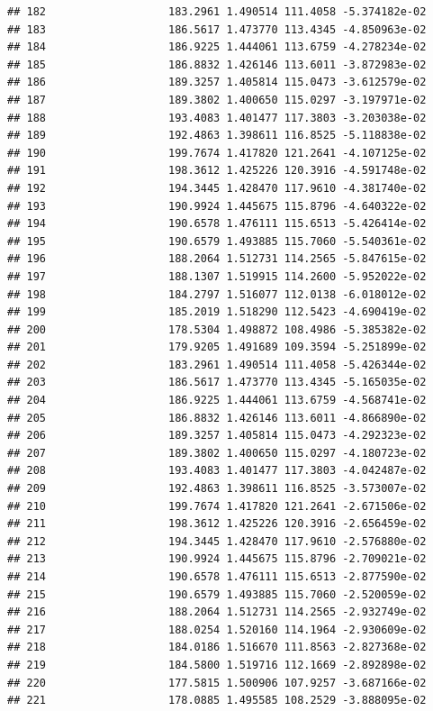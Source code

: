 \documentclass[
]{article}
\begin{document}
\begin{verbatim}
## 182                   183.2961 1.490514 111.4058 -5.374182e-02
## 183                   186.5617 1.473770 113.4345 -4.850963e-02
## 184                   186.9225 1.444061 113.6759 -4.278234e-02
## 185                   186.8832 1.426146 113.6011 -3.872983e-02
## 186                   189.3257 1.405814 115.0473 -3.612579e-02
## 187                   189.3802 1.400650 115.0297 -3.197971e-02
## 188                   193.4083 1.401477 117.3803 -3.203038e-02
## 189                   192.4863 1.398611 116.8525 -5.118838e-02
## 190                   199.7674 1.417820 121.2641 -4.107125e-02
## 191                   198.3612 1.425226 120.3916 -4.591748e-02
## 192                   194.3445 1.428470 117.9610 -4.381740e-02
## 193                   190.9924 1.445675 115.8796 -4.640322e-02
## 194                   190.6578 1.476111 115.6513 -5.426414e-02
## 195                   190.6579 1.493885 115.7060 -5.540361e-02
## 196                   188.2064 1.512731 114.2565 -5.847615e-02
## 197                   188.1307 1.519915 114.2600 -5.952022e-02
## 198                   184.2797 1.516077 112.0138 -6.018012e-02
## 199                   185.2019 1.518290 112.5423 -4.690419e-02
## 200                   178.5304 1.498872 108.4986 -5.385382e-02
## 201                   179.9205 1.491689 109.3594 -5.251899e-02
## 202                   183.2961 1.490514 111.4058 -5.426344e-02
## 203                   186.5617 1.473770 113.4345 -5.165035e-02
## 204                   186.9225 1.444061 113.6759 -4.568741e-02
## 205                   186.8832 1.426146 113.6011 -4.866890e-02
## 206                   189.3257 1.405814 115.0473 -4.292323e-02
## 207                   189.3802 1.400650 115.0297 -4.180723e-02
## 208                   193.4083 1.401477 117.3803 -4.042487e-02
## 209                   192.4863 1.398611 116.8525 -3.573007e-02
## 210                   199.7674 1.417820 121.2641 -2.671506e-02
## 211                   198.3612 1.425226 120.3916 -2.656459e-02
## 212                   194.3445 1.428470 117.9610 -2.576880e-02
## 213                   190.9924 1.445675 115.8796 -2.709021e-02
## 214                   190.6578 1.476111 115.6513 -2.877590e-02
## 215                   190.6579 1.493885 115.7060 -2.520059e-02
## 216                   188.2064 1.512731 114.2565 -2.932749e-02
## 217                   188.0254 1.520160 114.1964 -2.930609e-02
## 218                   184.0186 1.516670 111.8563 -2.827368e-02
## 219                   184.5800 1.519716 112.1669 -2.892898e-02
## 220                   177.5815 1.500906 107.9257 -3.687166e-02
## 221                   178.0885 1.495585 108.2529 -3.888095e-02

\end{verbatim}
\end{document}
